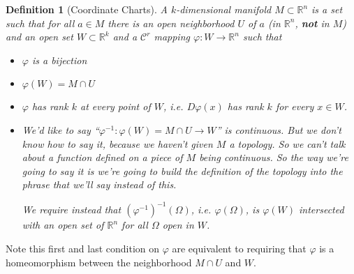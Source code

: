 \documentclass{article}
\newtheorem{definition}{Definition}
\newcommand{\reals}[0]{\mathbb{R}}
\newcommand{\mc}[1]{\mathcal{#1}}
\begin{document}
\begin{definition}[Coordinate Charts]
A \(k\)-dimensional manifold \(M \subset \reals^n\) is a set such that for all \(a \in M\) there is an open neighborhood \(U\) of \(a\) (in \(\reals^n\), \textbf{not} in \(M\)) and an open set \(W \subset \reals^k\) and a \(\mc{C}^r\) mapping \(\varphi: W \to \reals^n\) such that
\begin{itemize}
  \item \(\varphi\) is a bijection
  \item \(\varphi(W) = M \cap U\)
  \item \(\varphi\) has rank \(k\) at every point of \(W\), i.e. \(D\varphi(x)\) has rank \(k\) for every \(x \in W\).
  \item We'd like to say ``\(\varphi^{-1}: \varphi(W) = M \cap U \to W\)'' is continuous. But we don't know how to say it, because we haven't given \(M\) a topology. So we can't talk about a function defined on a piece of \(M\) being continuous. So the way we're going to say it is we're going to build the definition of the topology into the phrase that we'll say instead of this.

  We require instead that
  \((\varphi^{-1})^{-1}(\Omega)\), i.e. \(\varphi(\Omega)\), is \(\varphi(W)\) intersected with an open set of \(\reals^n\) for all \(\Omega\) open in \(W\).
\end{itemize}
\label{def:manifoldbycoords}
\end{definition}
Note this first and last condition on \(\varphi\) are equivalent to requiring that \(\varphi\) is a homeomorphism between the neighborhood \(M \cap U\) and \(W\).
\end{document}
